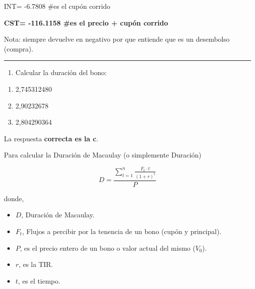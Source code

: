 \documentclass[
  letterpaper,
  DIV=11,
  numbers=noendperiod]{scrreprt}
\providecommand{\tightlist}{%
  \setlength{\itemsep}{0pt}\setlength{\parskip}{0pt}}\usepackage{longtable,booktabs,array}
\begin{document}
\begin{tcolorbox}
\begin{tcolorbox}
INT= -6.7808 \#es el cupón corrido

\textbf{CST= -116.1158 \#es el precio + cupón corrido}

Nota: siempre devuelve en negativo por que entiende que es un desembolso
(compra).

\end{tcolorbox}

\begin{center}\rule{0.5\linewidth}{0.5pt}\end{center}

\begin{enumerate}
\def\labelenumi{\arabic{enumi}.}
\setcounter{enumi}{1}
\tightlist
\item
  Calcular la duración del bono:
\end{enumerate}

\begin{enumerate}
\def\labelenumi{\alph{enumi}.}
\item
  2,745312480
\item
  2,90232678
\item
  2,804290364
\end{enumerate}

\begin{tcolorbox}[enhanced jigsaw, toprule=.15mm, left=2mm, breakable, opacitybacktitle=0.6, toptitle=1mm, coltitle=black, arc=.35mm, leftrule=.75mm, bottomtitle=1mm, titlerule=0mm, title=\textcolor{quarto-callout-tip-color}{\faLightbulb}\hspace{0.5em}{Solución}, rightrule=.15mm, opacityback=0, bottomrule=.15mm, colback=white, colframe=quarto-callout-tip-color-frame, colbacktitle=quarto-callout-tip-color!10!white]

La respuesta \textbf{correcta es la c}.

Para calcular la Duración de Macaulay (o simplemente Duración)

\[D=\frac{\sum_{t=1}^{n}\frac{F_t\cdot t}{\left(1+r\right)^t}}{P}\]

donde,

\begin{itemize}
\item
  \(D\), Duración de Macaulay.
\item
  \(F_t\), Flujos a percibir por la tenencia de un bono (cupón y
  principal).
\item
  \(P\), es el precio entero de un bono o valor actual del mismo
  (\(V_0\)).
\item
  \(r\), es la TIR.
\item
  \(t\), es el tiempo.
\end{itemize}


\end{tcolorbox}
\end{tcolorbox}
\end{document}
